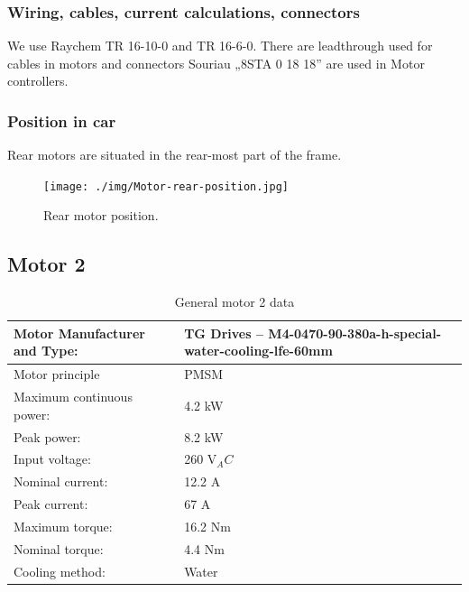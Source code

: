 \subsubsection{Wiring, cables, current calculations, connectors}
We use Raychem TR 16-10-0 and TR 16-6-0. There are leadthrough used for cables in motors and connectors Souriau „8STA 0 18 18” are used in Motor controllers.

\subsubsection{Position in car}

Rear motors are situated in the rear-most part of the frame. 

\begin{figure}[H]
	\centering
	\texttt{[image: ./img/Motor-rear-position.jpg]}
	\caption{Rear motor position.}
	\label{fig:Motor-rear-position}
\end{figure}

\subsection{Motor 2}%

\begin{table}[H]
	\centering
	\caption{General motor 2 data}
	\begin{tabu}{|X|X|}\hline
		Motor Manufacturer and Type: & TG Drives – M4-0470-90-380a-h-special-water-cooling-lfe-60mm \\\hline
		Motor principle & PMSM \\\hline
		Maximum continuous power: & 4.2 kW \\\hline
		Peak power: & 8.2 kW \\\hline
		Input voltage: & 260 V$_AC$ \\\hline
		Nominal current: & 12.2 A \\\hline
		Peak current: & 67 A \\\hline
		Maximum torque: & 16.2 Nm \\\hline
		Nominal torque: & 4.4 Nm \\\hline
		Cooling method: & Water \\\hline
	\end{tabu}%
	\label{tab:motors2-general}%
\end{table}%

